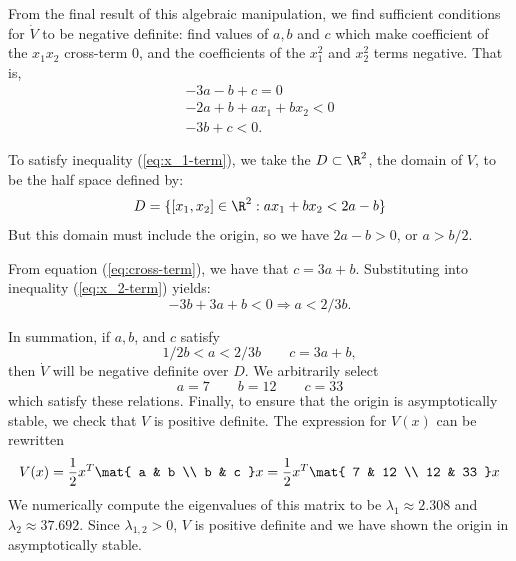 \documentclass{homework}
\begin{document}
\begin{letterenum}
From the final result of this algebraic manipulation, we find sufficient conditions
for $\dot{V}$ to be negative definite: find values of $a,b$ and $c$ which
make coefficient of the $x_1x_2$ cross-term 0, and the coefficients of the
$x_1^2$ and $x_2^2$ terms negative. That is,
\begin{align}
    -3a - b + c = 0 \label{eq:cross-term} \\
    -2a + b + ax_1 + bx_2 < 0 \label{eq:x_1-term} \\
    -3b + c < 0.  \label{eq:x_2-term}
\end{align}

To satisfy inequality (\ref{eq:x_1-term}), we take the $D\subset \R^2$,
the domain of $V$, to be the half space defined by:
\begin{equation*}
    D = \{[x_1, x_2]\in\R^2: ax_1 + bx_2 < 2a - b \}
\end{equation*}
But this domain must include the origin, so we have $2a - b > 0$, or $a > b/2$.

From equation (\ref{eq:cross-term}), we have that $c = 3a + b$. Substituting 
into inequality (\ref{eq:x_2-term}) yields:
\begin{equation*}
    -3b + 3a + b < 0 \Rightarrow a < 2/3 b.
\end{equation*}

In summation, if $a,b$, and $c$ satisfy
\begin{equation*}
    1/2 b < a < 2/3 b \qquad c = 3a + b,
\end{equation*}
then $\dot{V}$ will be negative definite over $D$. We arbitrarily select
\begin{equation*}
    a = 7 \qquad b = 12 \qquad c = 33
\end{equation*}
which satisfy these relations. Finally, to ensure that the origin is asymptotically
stable, we check that $V$ is positive definite. The expression for $V(x)$ can be
rewritten
\begin{equation*}
    V(x) = \frac{1}{2} x^T \mat{
        a & b \\
        b & c
    } x = \frac{1}{2} x^T \mat{
        7 & 12 \\
        12 & 33
    } x
\end{equation*}
We numerically compute the eigenvalues of this matrix to be
$\lambda_1 \approx 2.308$ and $\lambda_2 \approx 37.692$. Since $\lambda_{1,2} > 0$,
$V$ is positive definite and we have shown the origin in asymptotically stable.

\end{letterenum}
\end{document}
